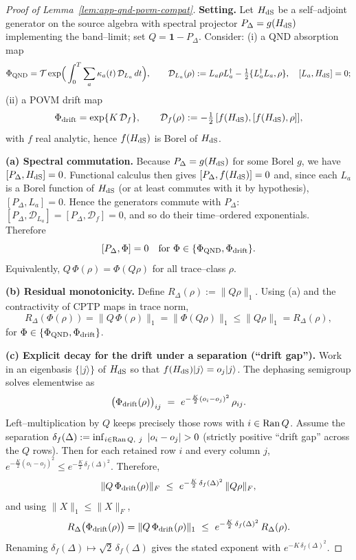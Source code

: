 \documentclass[10pt]{article}
\theoremstyle{definition}
\theoremstyle{plain}
\begin{document}
\begin{proof}[Proof of Lemma~\ref{lem:app-qnd-povm-compat}]
\textbf{Setting.}
Let \(H_{\rm dS}\) be a self–adjoint generator on the source algebra with spectral projector \(P_\Delta=g(H_{\rm dS})\) implementing the band–limit; set \(Q=\mathbf 1-P_\Delta\).
Consider:
(i) a QND absorption map
\[
\Phi_{\rm QND}=\mathcal T\exp\!\Big(\int_0^T\sum_a \kappa_a(t)\,\mathcal D_{L_a}\,dt\Big),
\qquad
\mathcal D_{L_a}(\rho):=L_a\rho L_a^\dagger-\tfrac12\{L_a^\dagger L_a,\rho\},
\quad [L_a,H_{\rm dS}]=0;
\]
(ii) a POVM drift map
\[
\Phi_{\rm drift}=\exp\{K\,\mathcal D_f\},\qquad
\mathcal D_f(\rho):=-\tfrac12\,[f(H_{\rm dS}),[f(H_{\rm dS}),\rho]],
\]
with \(f\) real analytic, hence \(f(H_{\rm dS})\) is Borel of \(H_{\rm dS}\).

\smallskip
\textbf{(a) Spectral commutation.}
Because \(P_\Delta=g(H_{\rm dS})\) for some Borel \(g\), we have \([P_\Delta,H_{\rm dS}]=0\).
Functional calculus then gives \([P_\Delta,f(H_{\rm dS})]=0\) and, since each \(L_a\) is a Borel function of \(H_{\rm dS}\) (or at least commutes with it by hypothesis), \([P_\Delta,L_a]=0\).
Hence the generators commute with \(P_\Delta\):
\(
[P_\Delta,\mathcal D_{L_a}]=[P_\Delta,\mathcal D_f]=0
\),
and so do their time–ordered exponentials. Therefore
\[
[P_\Delta,\Phi]=0\quad\text{for}\ \Phi\in\{\Phi_{\rm QND},\Phi_{\rm drift}\}.
\]
Equivalently, \(Q\,\Phi(\rho)=\Phi(Q\rho)\) for all trace–class \(\rho\).

\smallskip
\textbf{(b) Residual monotonicity.}
Define \(R_\Delta(\rho):=\|Q\rho\|_1\).
Using (a) and the contractivity of CPTP maps in trace norm,
\[
R_\Delta(\Phi(\rho))=\|Q\,\Phi(\rho)\|_1=\|\Phi(Q\rho)\|_1\le \|Q\rho\|_1=R_\Delta(\rho),
\]
for \(\Phi\in\{\Phi_{\rm QND},\Phi_{\rm drift}\}\).

\smallskip
\textbf{(c) Explicit decay for the drift under a separation (``drift gap'').}
Work in an eigenbasis \(\{|j\rangle\}\) of \(H_{\rm dS}\) so that \(f(H_{\rm dS})|j\rangle=o_j|j\rangle\).
The dephasing semigroup solves elementwise as
\[
\big(\Phi_{\rm drift}(\rho)\big)_{ij}\ =\ e^{-\frac{K}{2}(o_i-o_j)^2}\,\rho_{ij}.
\]
Left–multiplication by \(Q\) keeps precisely those rows with \(i\in{\rm Ran}\,Q\).
Assume the separation
\(
\delta_f(\Delta):=\inf_{i\in{\rm Ran}\,Q,\ j}\ |o_i-o_j|>0
\)
(strictly positive ``drift gap'' across the \(Q\) rows).
Then for each retained row \(i\) and every column \(j\),
\(
e^{-\frac{K}{2}(o_i-o_j)^2}\le e^{-\frac{K}{2}\,\delta_f(\Delta)^2}.
\)
Therefore,
\[
\|Q\,\Phi_{\rm drift}(\rho)\|_F\ \le\ e^{-\frac{K}{2}\,\delta_f(\Delta)^2}\,\|Q\rho\|_F,
\]
and using \(\|X\|_1\le \|X\|_F\),
\[
R_\Delta\big(\Phi_{\rm drift}(\rho)\big)=\|Q\,\Phi_{\rm drift}(\rho)\|_1
\ \le\ e^{-\frac{K}{2}\,\delta_f(\Delta)^2}\,R_\Delta(\rho).
\]
Renaming \(\delta_f(\Delta)\mapsto \sqrt{2}\,\delta_f(\Delta)\) gives the stated exponent with \(e^{-K\,\delta_f(\Delta)^2}\).
\end{proof}
\end{document}
